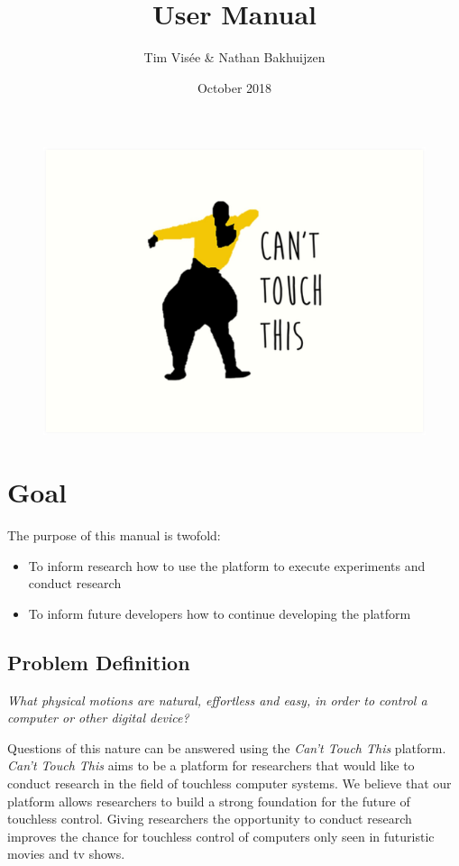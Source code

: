 \documentclass[a4paper]{article}
\title{User Manual}
\author{Tim Visée \& Nathan Bakhuijzen}
\date{October 2018}
\providecommand{\tightlist}{%
\setlength{\itemsep}{0pt}\setlength{\parskip}{0pt}}
\begin{document}
  \maketitle
  \begin{figure}[h]
    \centering
    \includegraphics[width=\linewidth]{cant-touch-this}
  \end{figure}
  \clearpage

  \section{Goal}
  The purpose of this manual is twofold:
  \begin{itemize}
    \tightlist{}
    \item To inform research how to use the platform to execute experiments and
      conduct research
    \item To inform future developers how to continue developing the platform
  \end{itemize}

  \subsection{Problem Definition}
  \textit{What physical motions are natural, effortless and easy, in order to
    control a computer or other digital device?}

  Questions of this nature can be answered using the \textit{Can't Touch This}
  platform. \textit{Can't Touch This} aims to be a platform for researchers that
  would like to conduct research in the field of touchless computer systems. We
  believe that our platform allows researchers to build a strong foundation for
  the future of touchless control. Giving researchers the opportunity to conduct
  research improves the chance for touchless control of computers only seen in
  futuristic movies and tv shows.
\end{document}
